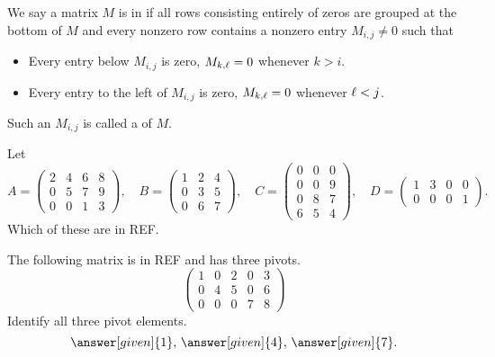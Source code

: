 \documentclass{ximera}
\begin{document}
\begin{definition}
  We say a matrix $M$ is in  if all rows
  consisting entirely of zeros are grouped at the bottom of $M$ and
  every nonzero row contains a nonzero entry $M_{i,j}\ne 0$ such that
  \begin{itemize}
  \item Every entry below $M_{i,j}$ is zero, $M_{k,\ell}=0$ whenever $k> i$.
  \item Every entry to the left of $M_{i,j}$ is zero, $M_{k,\ell}=0$ whenever $\ell < j$.
  \end{itemize}
  Such an $M_{i,j}$ is called a  of $M$.
\end{definition}

\begin{question}
  Let
  \[
    A =
    \begin{pmatrix}
      2 & 4 & 6 & 8 \\
      0 & 5 & 7 & 9 \\
      0 & 0 & 1 & 3
    \end{pmatrix}, \quad
    B =
    \begin{pmatrix}
      1 & 2 & 4 \\
      0 & 3 & 5 \\
      0 & 6 & 7
    \end{pmatrix}, \quad
    C =
    \begin{pmatrix}
      0 & 0 & 0 \\
      0 & 0 & 9 \\
      0 & 8 & 7 \\
      6 & 5 & 4
    \end{pmatrix}, \quad
    D =
    \begin{pmatrix}
      1 & 3 & 0 & 0 \\
      0 & 0 & 0 & 1
    \end{pmatrix}.
  \]
  Which of these are in REF.
  \begin{selectAll}
  \end{selectAll}
\end{question}

\begin{question}
  The following matrix is in REF and has three pivots.
  \[
    \begin{pmatrix}
      1 & 0 & 2 & 0 & 3 \\
      0 & 4 & 5 & 0 & 6 \\
      0 & 0 & 0 & 7 & 8
    \end{pmatrix}
  \]
  Identify all three pivot elements.
  \[
    \answer[given]{1},\, \answer[given]{4},\, \answer[given]{7}.
  \]
\end{question}
\end{document}
